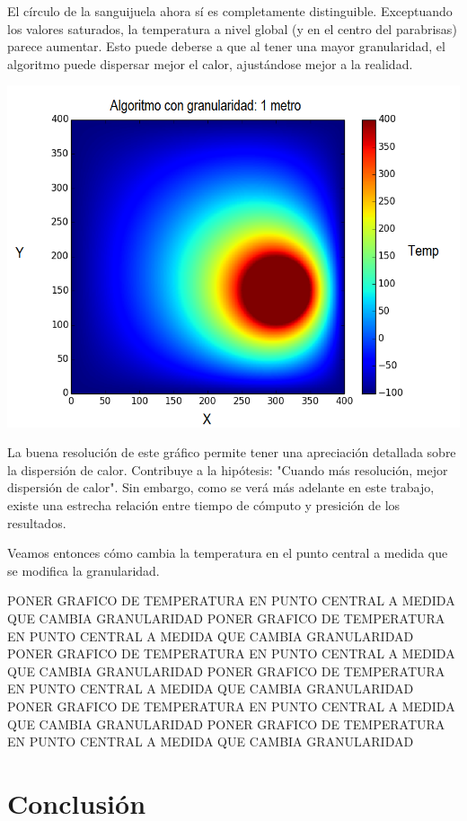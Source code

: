 	El círculo de la sanguijuela ahora sí es completamente distinguible. Exceptuando los valores saturados, la temperatura a nivel global (y en el centro del parabrisas) parece aumentar. Esto puede deberse a que al tener una mayor granularidad, el algoritmo puede dispersar mejor el calor, ajustándose mejor a la realidad.

	\begin{center}
		\includegraphics[width=\textwidth]{./img/granularidad/g1_t400_sinkill.png}
	\end{center}

	La buena resolución de este gráfico permite tener una apreciación detallada sobre la dispersión de calor. Contribuye a la hipótesis: "Cuando más resolución, mejor dispersión de calor". Sin embargo, como se verá más adelante en este trabajo, existe una estrecha relación entre tiempo de cómputo y presición de los resultados. 

	Veamos entonces cómo cambia la temperatura en el punto central a medida que se modifica la granularidad.


	PONER GRAFICO DE TEMPERATURA EN PUNTO CENTRAL A MEDIDA QUE CAMBIA GRANULARIDAD
	PONER GRAFICO DE TEMPERATURA EN PUNTO CENTRAL A MEDIDA QUE CAMBIA GRANULARIDAD
	PONER GRAFICO DE TEMPERATURA EN PUNTO CENTRAL A MEDIDA QUE CAMBIA GRANULARIDAD
	PONER GRAFICO DE TEMPERATURA EN PUNTO CENTRAL A MEDIDA QUE CAMBIA GRANULARIDAD
	PONER GRAFICO DE TEMPERATURA EN PUNTO CENTRAL A MEDIDA QUE CAMBIA GRANULARIDAD	PONER GRAFICO DE TEMPERATURA EN PUNTO CENTRAL A MEDIDA QUE CAMBIA GRANULARIDAD

\section{Conclusión}

